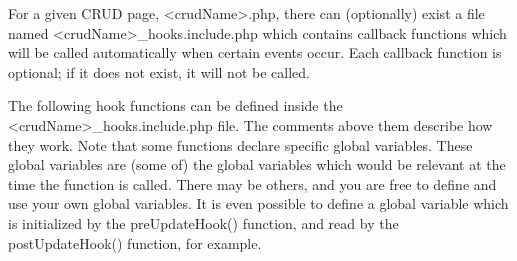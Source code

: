 \documentclass[letterpaper,10pt,english]{sphinxmanual}
\begin{document}
For a given CRUD page, \textless{}crudName\textgreater{}.php, there can (optionally) exist a file named
\textless{}crudName\textgreater{}\_hooks.include.php which contains callback functions which will be called automatically
when certain events occur.  Each callback function is optional; if it does not exist, it will not be
called.

The following hook functions can be defined inside the \textless{}crudName\textgreater{}\_hooks.include.php file.  The
comments above them describe how they work.  Note that some functions declare specific global
variables.  These global variables are (some of) the global variables which would be relevant at the
time the function is called.  There may be others, and you are free to define and use your own
global variables.  It is even possible to define a global variable which is initialized by the
preUpdateHook() function, and read by the postUpdateHook() function, for example.
\end{document}
